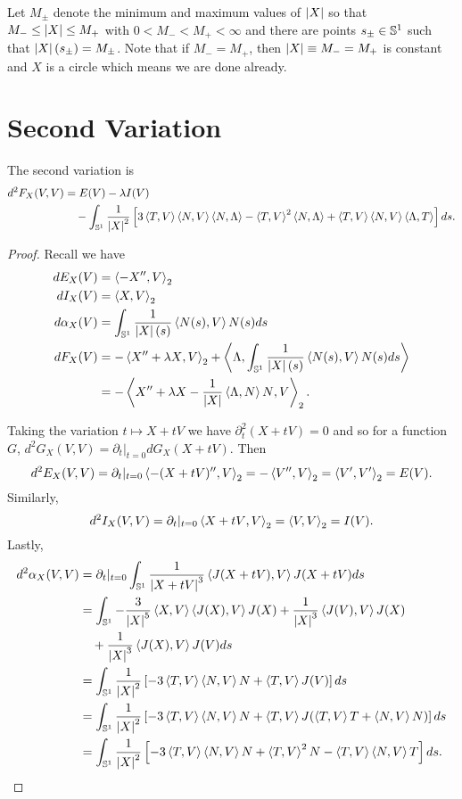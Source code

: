 \documentclass[12pt]{article}
\begin{document}
Let \(M_{\pm}\) denote the minimum and maximum values of \(\abs{X}\) so that \(M_- \leq \abs{X} \leq M_+\) with \(0 < M_- < M_+ < \infty\) and there are points \(s_{\pm} \in \So\) such that \(\abs{X}(s_{\pm}) = M_{\pm}\). Note that if \(M_- = M_+\), then \(\abs{X} \equiv M_- = M_+\) is constant and \(X\) is a circle which means we are done already. 


\section{Second Variation}

\begin{lem}
The second variation is
\[
\begin{split}
d^2F_X (V, V) &= E(V) - \lambda I(V) \\
&\quad - \int_{\So} \frac{1}{\abs{X}^2} \left[3\inpr{T}{V}\inpr{N}{V} \inpr{N}{\Lambda} - \inpr{T}{V}^2 \inpr{N}{\Lambda} + \inpr{T}{V}\inpr{N}{V} \inpr{\Lambda}{T} \right] ds.
\end{split}
\]
\end{lem}

\begin{proof}
Recall we have
\begin{align*}
dE_X (V) &= \inpr{-X''}{V}_2 \\
dI_X (V) &= \inpr{X}{V}_2 \\
d\alpha_X (V) &= \int_{\So} \frac{1}{\abs{X}(s)} \inpr{N(s)}{V} N(s) ds \\
dF_X (V) &= -\inpr{X'' + \lambda X}{V}_2 + \inpr{\Lambda}{\int_{\So} \frac{1}{\abs{X}(s)} \inpr{N(s)}{V} N(s) ds} \\
&= -\inpr{X'' + \lambda X - \frac{1}{\abs{X}} \inpr{\Lambda}{N}N}{V}_2.
\end{align*}

Taking the variation \(t \mapsto X + tV\) we have \(\partial_t^2 (X + tV) = 0\) and so for a function \(G\), \(d^2G_X (V, V) = \partial_t|_{t=0} dG_X(X + t V)\).
Then
\[
d^2E_X(V, V) = \partial_t|_{t=0} \inpr{-(X + tV)''}{V}_2 = -\inpr{V''}{V}_2 = \inpr{V'}{V'}_2 = E(V).
\]
Similarly,
\[
d^2I_X(V, V) = \partial_t|_{t=0} \inpr{X + t V}{V}_2 = \inpr{V}{V}_2 = I(V).
\]
Lastly,
\[
\begin{split}
d^2\alpha_X(V, V) &= \partial_t|_{t=0} \int_{\So} \frac{1}{\abs{X+tV}^3} \inpr{J(X+tV)}{V} J(X + tV) ds \\
&= \int_{\So} -\frac{3}{\abs{X}^5} \inpr{X}{V} \inpr{J(X)}{V} J(X) + \frac{1}{\abs{X}^3} \inpr{J(V)}{V} J(X) \\
&\quad + \frac{1}{\abs{X}^3} \inpr{J(X)}{V} J(V) ds \\
&= \int_{\So} \frac{1}{\abs{X}^2}\left[-3\inpr{T}{V}\inpr{N}{V} N + \inpr{T}{V} J(V)\right] ds \\
&= \int_{\So} \frac{1}{\abs{X}^2} \left[-3\inpr{T}{V}\inpr{N}{V} N + \inpr{T}{V} J(\inpr{T}{V} T + \inpr{N}{V} N) \right] ds \\
&= \int_{\So} \frac{1}{\abs{X}^2} \left[-3\inpr{T}{V}\inpr{N}{V} N + \inpr{T}{V}^2 N - \inpr{T}{V}\inpr{N}{V} T \right] ds.
\end{split}
\]
\end{proof}
\end{document}
